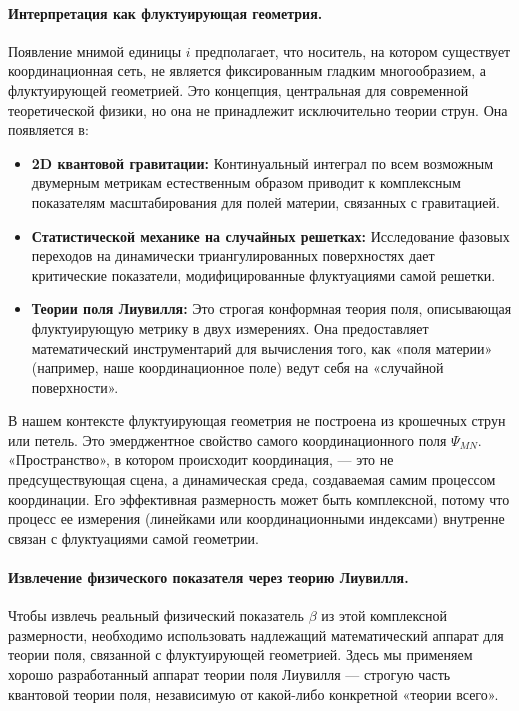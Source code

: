 \documentclass[12pt,a4paper]{article}
\theoremstyle{remark}
\begin{document}
	\paragraph{Интерпретация как флуктуирующая геометрия.}
	Появление мнимой единицы \(i\) предполагает, что носитель, на котором существует координационная сеть, не является фиксированным гладким многообразием, а флуктуирующей геометрией. Это концепция, центральная для современной теоретической физики, но она не принадлежит исключительно теории струн. Она появляется в:
	\begin{itemize}
		\item \textbf{2D квантовой гравитации:} Континуальный интеграл по всем возможным двумерным метрикам естественным образом приводит к комплексным показателям масштабирования для полей материи, связанных с гравитацией.
		\item \textbf{Статистической механике на случайных решетках:} Исследование фазовых переходов на динамически триангулированных поверхностях дает критические показатели, модифицированные флуктуациями самой решетки.
		\item \textbf{Теории поля Лиувилля:} Это строгая конформная теория поля, описывающая флуктуирующую метрику в двух измерениях. Она предоставляет математический инструментарий для вычисления того, как «поля материи» (например, наше координационное поле) ведут себя на «случайной поверхности».
	\end{itemize}
	В нашем контексте флуктуирующая геометрия не построена из крошечных струн или петель. Это эмерджентное свойство самого координационного поля \(\Psi_{MN}\). «Пространство», в котором происходит координация, — это не предсуществующая сцена, а динамическая среда, создаваемая самим процессом координации. Его эффективная размерность может быть комплексной, потому что процесс ее измерения (линейками или координационными индексами) внутренне связан с флуктуациями самой геометрии.
	
	\paragraph{Извлечение физического показателя через теорию Лиувилля.}
	Чтобы извлечь реальный физический показатель \(\beta\) из этой комплексной размерности, необходимо использовать надлежащий математический аппарат для теории поля, связанной с флуктуирующей геометрией. Здесь мы применяем хорошо разработанный аппарат теории поля Лиувилля — строгую часть квантовой теории поля, независимую от какой-либо конкретной «теории всего».
	
\end{document}
